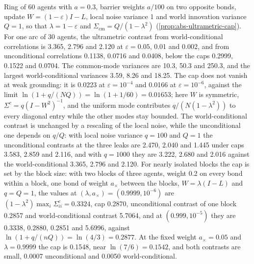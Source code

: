 \begin{numcheck}\label{chk:abs-cap}
Ring of 60 agents with $a=0.3$, barrier weights $a/100$ on two opposite bonds, update $W=(1-\varepsilon)I-L$, local noise variance 1 and world innovation variance $Q=1$, so that $\lambda=1-\varepsilon$ and $\Sigma_{\mathrm{cm}}=Q/(1-\lambda^2)$ (\cref{prop:abs-ultrametric-cap}). For one arc of 30 agents, the ultrametric contrast from world-conditional correlations is 3.365, 2.796 and 2.120 at $\varepsilon=0.05$, 0.01 and 0.002, and from unconditional correlations 0.1138, 0.0716 and 0.0408, below the caps 0.2999, 0.1522 and 0.0704. The common-mode variances are 10.3, 50.3 and 250.3, and the largest world-conditional variances 3.59, 8.26 and 18.25. The cap does not vanish at weak grounding: it is 0.0223 at $\varepsilon=10^{-4}$ and 0.0166 at $\varepsilon=10^{-6}$, against the limit $\ln(1+q/(NQ))=\ln(1+1/60)=0.01653$; here $W$ is symmetric, $\Sigma^c=q(I-W^2)^{-1}$, and the uniform mode contributes $q/(N(1-\lambda^2))$ to every diagonal entry while the other modes stay bounded. The world-conditional contrast is unchanged by a rescaling of the local noise, while the unconditional one depends on $q/Q$: with local noise variance $q=100$ and $Q=1$ the unconditional contrasts at the three leaks are 2.470, 2.040 and 1.445 under caps 3.583, 2.859 and 2.116, and with $q=1000$ they are 3.222, 2.680 and 2.016 against the world-conditional 3.365, 2.796 and 2.120. For nearly isolated blocks the cap is set by the block size: with two blocks of three agents, weight 0.2 on every bond within a block, one bond of weight $a_\times$ between the blocks, $W=\lambda(I-L)$ and $q=Q=1$, the values at $(\lambda,a_\times)=(0.9999,10^{-6})$ are $(1-\lambda^2)\max_i\Sigma^c_{ii}=0.3324$, cap 0.2870, unconditional contrast of one block 0.2857 and world-conditional contrast 5.7064, and at $(0.999,10^{-5})$ they are 0.3338, 0.2880, 0.2851 and 5.6996, against $\ln(1+q/(nQ))=\ln(4/3)=0.2877$. At the fixed weight $a_\times=0.05$ and $\lambda=0.9999$ the cap is 0.1548, near $\ln(7/6)=0.1542$, and both contrasts are small, 0.0007 unconditional and 0.0050 world-conditional.
\end{numcheck}
